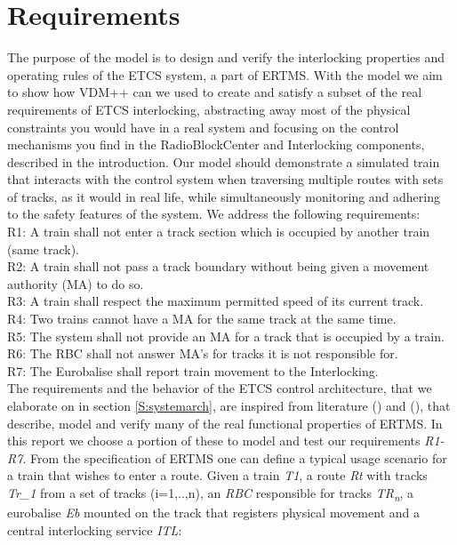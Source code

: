 \documentclass[preprint,12pt]{elsarticle}
\begin{document}
\section{Requirements}
\label{S:requirements}
The purpose of the model is to design and verify the interlocking properties and operating rules of the ETCS system, a part of ERTMS. With the model we aim to show how VDM++ can we used to create and satisfy a subset of the real requirements of ETCS interlocking, abstracting away most of the physical constraints you would have in a real system and focusing on the control mechanisms you find in the RadioBlockCenter and Interlocking components, described in the introduction. Our model should demonstrate a simulated train that interacts with the control system when traversing multiple routes with sets of tracks, as it would in real life, while simultaneously monitoring and adhering to the safety features of the system. We address the following requirements: \\

R1: A train shall not enter a track section which is occupied by another train (same track).\\
R2: A train shall not pass a track boundary without being given a movement authority (MA) to do so.\\
R3: A train shall respect the maximum permitted speed of its current track.\\
R4: Two trains cannot have a MA for the same track at the same time.\\
R5: The system shall not provide an MA for a track that is occupied by a train.\\
R6: The RBC shall not answer MA's for tracks it is not responsible for.\\
R7: The Eurobalise shall report train movement to the Interlocking.\\

The requirements and the behavior of the ETCS control architecture, that we elaborate on in section \ref{S:systemarch}, are inspired from literature (\citet{Berger2018}) and (\citet{Ghazel2014}), that describe, model and verify many of the real functional properties of ERTMS. In this report we choose a portion of these to model and test our requirements \textit{R1-R7}. From the specification of ERTMS one can define a typical usage scenario for a train that wishes to enter a route. Given a train \textit{T1}, a route \textit{Rt} with tracks \textit{Tr\_{1}} from a set of tracks (i=1,..,n), an \textit{RBC} responsible for tracks \textit{TR\textsubscript{n}}, a eurobalise \textit{Eb} mounted on the track that registers physical movement and a central interlocking service \textit{ITL}:
\end{document}

